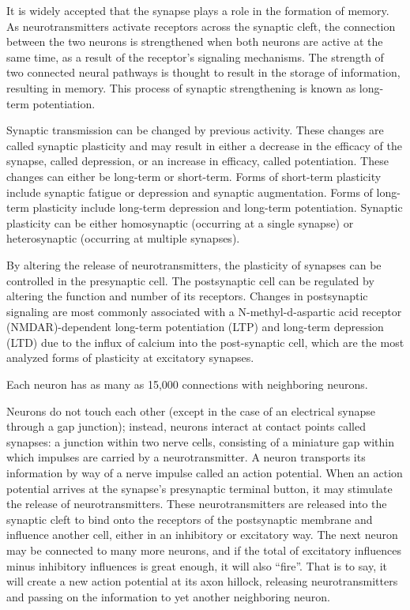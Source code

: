 It is widely accepted that the synapse plays a role in the formation of memory. As neurotransmitters activate receptors across the synaptic cleft, the connection between the two neurons is strengthened when both neurons are active at the same time, as a result of the receptor's signaling mechanisms. The strength of two connected neural pathways is thought to result in the storage of information, resulting in memory. This process of synaptic strengthening is known as long-term potentiation.

Synaptic transmission can be changed by previous activity. These changes are called synaptic plasticity and may result in either a decrease in the efficacy of the synapse, called depression, or an increase in efficacy, called potentiation. These changes can either be long-term or short-term. Forms of short-term plasticity include synaptic fatigue or depression and synaptic augmentation. Forms of long-term plasticity include long-term depression and long-term potentiation. Synaptic plasticity can be either homosynaptic (occurring at a single synapse) or heterosynaptic (occurring at multiple synapses).

By altering the release of neurotransmitters, the plasticity of synapses can be controlled in the presynaptic cell. The postsynaptic cell can be regulated by altering the function and number of its receptors. Changes in postsynaptic signaling are most commonly associated with a N-methyl-d-aspartic acid receptor (NMDAR)-dependent long-term potentiation (LTP) and long-term depression (LTD) due to the influx of calcium into the post-synaptic cell, which are the most analyzed forms of plasticity at excitatory synapses.

Each neuron has as many as 15,000 connections with neighboring neurons.

Neurons do not touch each other (except in the case of an electrical synapse through a gap junction); instead, neurons interact at contact points called synapses: a junction within two nerve cells, consisting of a miniature gap within which impulses are carried by a neurotransmitter. A neuron transports its information by way of a nerve impulse called an action potential. When an action potential arrives at the synapse's presynaptic terminal button, it may stimulate the release of neurotransmitters. These neurotransmitters are released into the synaptic cleft to bind onto the receptors of the postsynaptic membrane and influence another cell, either in an inhibitory or excitatory way. The next neuron may be connected to many more neurons, and if the total of excitatory influences minus inhibitory influences is great enough, it will also ``fire''. That is to say, it will create a new action potential at its axon hillock, releasing neurotransmitters and passing on the information to yet another neighboring neuron.

